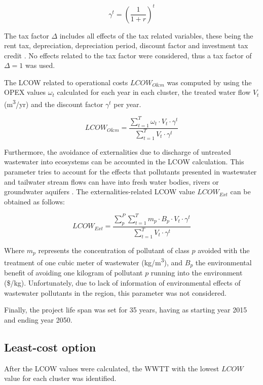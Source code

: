 \begin{equation}\label{eq:gamma}
\gamma^{t} = \left(\frac{1}{1+r}\right)^{t}
\end{equation}

The tax factor $\Delta$ includes all effects of the tax related variables, these being the rent tax, depreciation, depreciation period, discount factor and investment tax credit \cite{prospectscostcompetitive2013}. No effects related to the tax factor were considered, thus a tax factor of $\Delta=1$ was used.

The LCOW related to operational costs $LCOW_{O\&m}$  was computed by using the OPEX values $\omega_{t}$ calculated for each year in each cluster, the treated water flow $V_{t}$ (m\textsuperscript{3}/yr) and the discount factor $\gamma^t$ per year.

\begin{equation}\label{eq:lcow_om}
LCOW_{O\&m} = \frac{\sum_{t=1}^{T} \omega_{t}\cdot V_{t}\cdot\gamma^{t}}{\sum_{t=1}^{T} V_{t}\cdot\gamma^{t}}
\end{equation}

Furthermore, the avoidance of externalities due to discharge of untreated wastewater into ecosystems can be accounted in the LCOW calculation. This parameter tries to account for the effects that pollutants presented in wastewater and tailwater stream flows can have into fresh water bodies, rivers or groundwater aquifers \cite{Assessmentwastewatertreatment2012}. The externalities-related LCOW value $LCOW_{Ext}$  can be obtained as follows:

\begin{equation}\label{eq:lcow_ext}
LCOW_{Ext} = \frac{\sum_{p}^{P}\sum_{t=1}^{T} m_{p}\cdot B_p\cdot V_{t}\cdot\gamma^{t}}{\sum_{t=1}^{T} V_{t}\cdot\gamma^{t}}
\end{equation}

Where $m_p$ represents the concentration of pollutant of class $p$ avoided with the treatment of one cubic meter of wastewater (kg/m\textsuperscript{3}), and $B_p$ the environmental benefit of avoiding one kilogram of pollutant $p$ running into the environment (\$/kg). Unfortunately, due to lack of information of environmental effects of wastewater pollutants in the region, this parameter was not considered.

Finally, the project life span was set for 35 years, having as starting year 2015 and ending year 2050.

\subsection{Least-cost option}
After the LCOW values were calculated, the WWTT with the lowest $LCOW$ value for each cluster was identified.